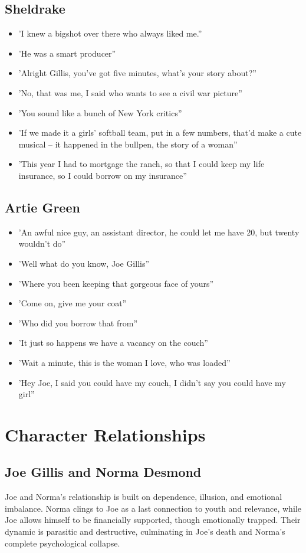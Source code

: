 \documentclass[a4paper]{article}
\begin{document}
\subsection{Sheldrake}
\begin{itemize}
\item 'I knew a bigshot over there who always liked me.”
\item 'He was a smart producer”
\item 'Alright Gillis, you’ve got five minutes, what's your story about?”
\item 'No, that was me, I said who wants to see a civil war picture”
\item 'You sound like a bunch of New York critics”
\item 'If we made it a girls' softball team, put in a few numbers, that’d make a cute musical – it happened in the bullpen, the story of a woman”
\item 'This year I had to mortgage the ranch, so that I could keep my life insurance, so I could borrow on my insurance”
\end{itemize}

\subsection{Artie Green}
\begin{itemize}
\item 'An awful nice guy, an assistant director, he could let me have 20, but twenty wouldn't do”
\item 'Well what do you know, Joe Gillis”
\item 'Where you been keeping that gorgeous face of yours”
\item 'Come on, give me your coat”
\item 'Who did you borrow that from”
\item 'It just so happens we have a vacancy on the couch”
\item 'Wait a minute, this is the woman I love, who was loaded”
\item 'Hey Joe, I said you could have my couch, I didn’t say you could have my girl”
\end{itemize}
\newpage


\section{Character Relationships}

\subsection{Joe Gillis and Norma Desmond}
Joe and Norma's relationship is built on dependence, illusion, and emotional imbalance. Norma clings to Joe as a last connection to youth and relevance, while Joe allows himself to be financially supported, though emotionally trapped. Their dynamic is parasitic and destructive, culminating in Joe’s death and Norma’s complete psychological collapse.
\end{document}
